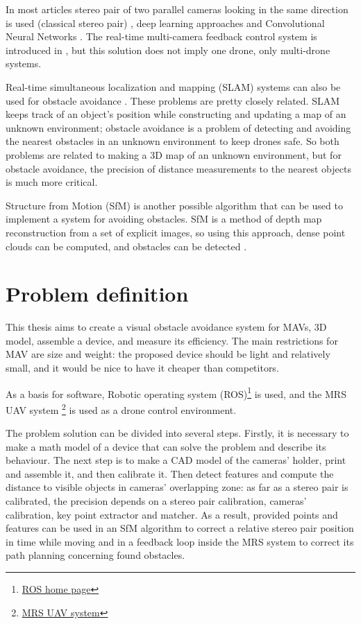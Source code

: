 In most articles stereo pair of two parallel cameras looking in the same direction is used (classical stereo pair) \cite{Yu2018, Lin2021, Xiao2019}, deep learning approaches \cite{Back2020, FragaLamas2019, Park2020, Roghair2021} and Convolutional Neural Networks \cite{Yu2013, Ma2020}. 
The real-time multi-camera feedback control system is introduced in \cite{He2021}, but this solution does not imply one drone, only multi-drone systems.

Real-time simultaneous localization and mapping (SLAM) systems can also be used for obstacle avoidance \cite{Moreno2014}. 
These problems are pretty closely related. 
SLAM keeps track of an object's position while constructing and updating a map of an unknown environment; obstacle avoidance is a problem of detecting and avoiding the nearest obstacles in an unknown environment to keep drones safe.
So both problems are related to making a 3D map of an unknown environment, but for obstacle avoidance, the precision of distance measurements to the nearest objects is much more critical.

Structure from Motion (SfM) is another possible algorithm that can be used to implement a system for avoiding obstacles. 
SfM is a method of depth map reconstruction from a set of explicit images, so using this approach, dense point clouds can be computed, and obstacles can be detected \cite{Lee2008}. 

\section{Problem definition}
This thesis aims to create a visual obstacle avoidance system for MAVs, 3D model, assemble a device, and measure its efficiency. 
The main restrictions for MAV are size and weight: the proposed device should be light and relatively small, and it would be nice to have it cheaper than competitors.

As a basis for software, Robotic operating system (ROS)\footnote{\href{https://www.ros.org/}{ROS home page}} is used, and the MRS UAV system \cite{Baca2021} \footnote{\href{https://github.com/ctu-mrs/mrs_uav_system}{MRS UAV system}} is used as a drone control environment.

The problem solution can be divided into several steps. 
Firstly, it is necessary to make a math model of a device that can solve the problem and describe its behaviour. 
The next step is to make a CAD model of the cameras' holder, print and assemble it, and then calibrate it. 
Then detect features and compute the distance to visible objects in cameras' overlapping zone: as far as a stereo pair is calibrated, the precision depends on a stereo pair calibration, cameras' calibration, key point extractor and matcher.
As a result, provided points and features can be used in an SfM algorithm to correct a relative stereo pair position in time while moving and in a feedback loop inside the MRS system to correct its path planning concerning found obstacles.
